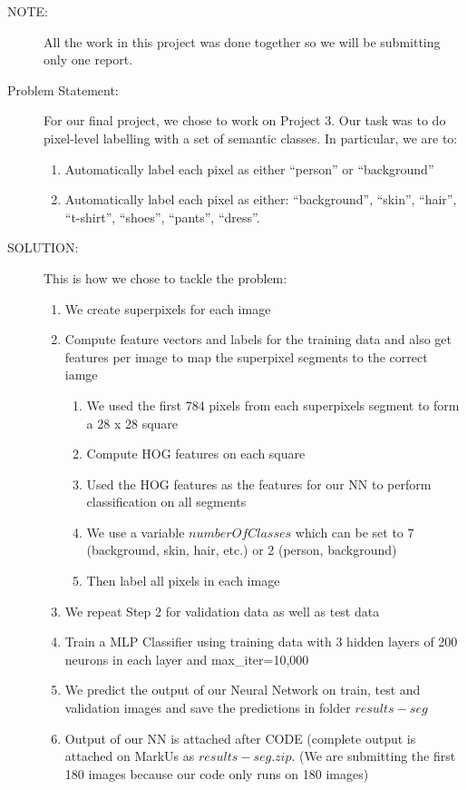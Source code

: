 \documentclass{csc_assignment5}
\begin{document}
\begin{description}

\item[NOTE:]
All the work in this project was done together so we will be submitting only one report.
\item[Problem Statement:]
For our final project, we chose to work on Project 3. Our task was to do pixel-level labelling with a set of semantic classes. In particular, we are to:
\begin{enumerate}
\item Automatically label each pixel as either ``person'' or ``background''
\item Automatically label each pixel as either: ``background'', ``skin'', ``hair'', ``t-shirt'', ``shoes'', ``pants'', ``dress''.
\end{enumerate}

\item[SOLUTION:]
This is how we chose to tackle the problem:
\begin{enumerate}
\item We create superpixels for each image
\item Compute feature vectors and labels for the training data and also get features per image to map the superpixel segments to the correct iamge
\begin{enumerate}
\item We used the first 784 pixels from each superpixels segment to form a 28 x 28 square
\item Compute HOG features on each square
\item Used the HOG features as the features for our NN to perform classification on all segments
\item We use a variable $numberOfClasses$ which can be set to 7 (background, skin, hair, etc.) or 2 (person, background)
\item Then label all pixels in each image
\end{enumerate}
\item We repeat Step 2 for validation data as well as test data
\item Train a MLP Classifier using training data with 3 hidden layers of 200 neurons in each layer and max\_iter=10,000
\item We predict the output of our Neural Network on train, test and validation images and save the predictions in folder $results-seg$
\item Output of our NN is attached after CODE (complete output is attached on MarkUs as $results-seg.zip$. (We are submitting the first 180 images because our code only runs on 180 images)
\end{enumerate}


\end{description}
\end{document}
